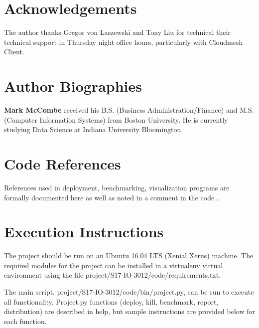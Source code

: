 \documentclass[9pt,twocolumn,twoside]{../../styles/osajnl}
\begin{document}
\section*{Acknowledgements}

The author thanks Gregor von Laszewski and Tony Liu for technical their technical support in Thursday night office hours, particularly with Cloudmesh Client.




 
\section*{Author Biographies}
\begingroup
\setlength\intextsep{0pt}
\begin{minipage}[t][3.2cm][t]{1.0\columnwidth} %
  \noindent
{\bfseries Mark McCombe} received his B.S. (Business Administration/Finance) and M.S. (Computer Information Systems) from Boston University.  He is currently studying Data Science at Indiana University Bloomington.

\end{minipage}
\endgroup

\newpage

\appendix

\section{Code References}
References used in deployment, benchmarking, visualization programs are formally documented here as well as noted in a comment in the code \cite{www-bashNum} \cite{www-lastChar} \cite{www-configOpts} \cite{www-bashArgs} \cite{www-cmVms}  \cite{www-python1}  \cite{www-python2}  \cite{www-python3} \cite{www-ansibleDir} \cite{www-mongoAnsible} \cite{www-ansibleCopy} \cite{www-ansibleHost} \cite{www-installMongo} \cite{www-ansiblePython}.

\section{Execution Instructions}

The project should be run on an Ubuntu 16.04 LTS (Xenial Xerus) machine.  The required modules for the project can be installed in a virtualenv virtual environment using the file project/S17-IO-3012/code/requirements.txt.

The main script, project/S17-IO-3012/code/bin/project.py, can be run to execute all functionality.  Project.py functions (deploy, kill, benchmark, report, distribution) are described in help, but sample instructions are provided below for each function.
\end{document}
